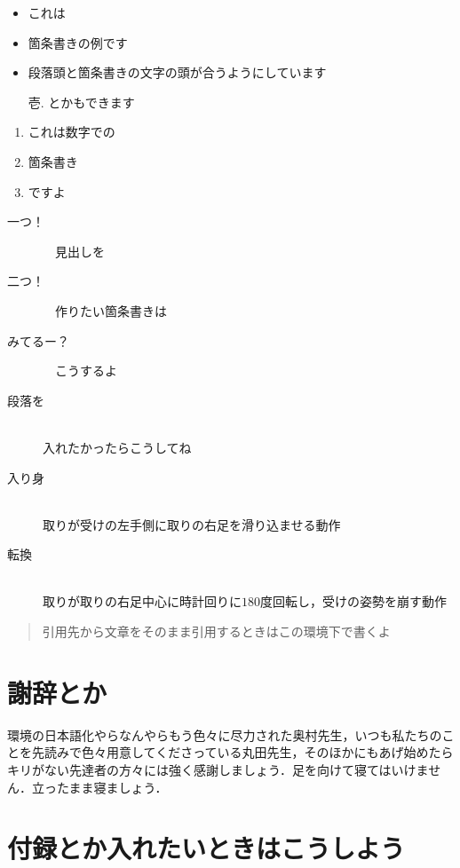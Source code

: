 \documentclass[platex,dvipdfmx]{jlreq}%
\numberwithin{equation}{section}%
\begin{document}
\begin{itemize}
 \item これは
 \item 箇条書きの例です
 \item 段落頭と箇条書きの文字の頭が合うようにしています
 \item[壱.] とかもできます 
\end{itemize}

\begin{enumerate}
 \item これは数字での
 \item 箇条書き
 \item ですよ
\end{enumerate}

\begin{description}
 \item[一つ！]　見出しを 
 \item[二つ！]　作りたい箇条書きは
 \item[みてるー？]　こうするよ 
 \item[段落を]\mbox{}\\
	    入れたかったらこうしてね
 \item[入り身]\mbox{}\\
	    取りが受けの左手側に取りの右足を滑り込ませる動作
 \item[転換]\mbox{}\\
	    取りが取りの右足中心に時計回りに$180$度回転し，受けの姿勢を崩す動作
\end{description}



\begin{quotation}
 引用先から文章をそのまま引用するときはこの環境下で書くよ
\end{quotation}

  
\section*{謝辞とか}

\LaTeXe 環境の日本語化やらなんやらもう色々に尽力された奥村先生\cite{okumura7th}，いつも私たちのことを先読みで色々用意してくださっている丸田先生，そのほかにもあげ始めたらキリがない先達者の方々には強く感謝しましょう．足を向けて寝てはいけません．立ったまま寝ましょう．

\appendix
\section{付録とか入れたいときはこうしよう}
\end{document}
